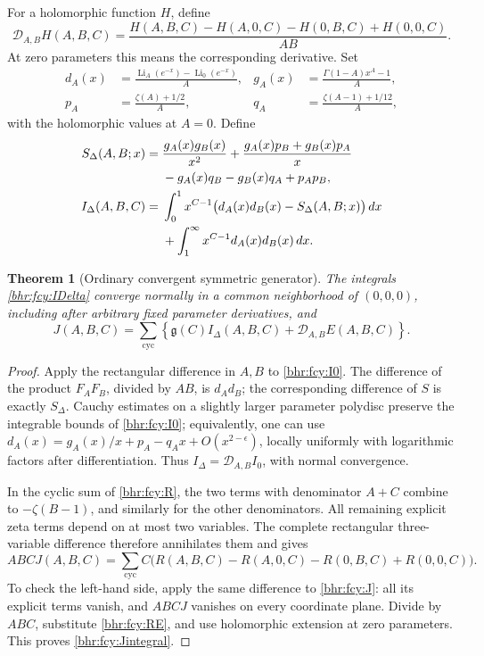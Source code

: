 \documentclass[11pt]{article}
\numberwithin{equation}{section}
\theoremstyle{plain}
\newtheorem{theorem}{Theorem}[section]
\theoremstyle{definition}
\theoremstyle{remark}
\begin{document}
For a holomorphic function \(H\), define
\[
 \mathcal D_{A,B}H(A,B,C)=
 \frac{H(A,B,C)-H(A,0,C)-H(0,B,C)+H(0,0,C)}{AB}.
\]
At zero parameters this means the corresponding derivative. Set
\begin{align*}
 d_A(x)&=\frac{\operatorname{Li}_A(e^{-x})-\operatorname{Li}_0(e^{-x})}{A},&
 g_A(x)&=\frac{\Gamma(1-A)x^A-1}{A},\\
 p_A&=\frac{\zeta(A)+1/2}{A},&
 q_A&=\frac{\zeta(A-1)+1/12}{A},
\end{align*}
with the holomorphic values at \(A=0\). Define
\begin{align}
 S_\Delta(A,B;x)={}&\frac{g_A(x)g_B(x)}{x^2}
 +\frac{g_A(x)p_B+g_B(x)p_A}{x}\notag\\
 &-g_A(x)q_B-g_B(x)q_A+p_Ap_B,
 \label{bhr:fcy:SDelta}\\
 I_\Delta(A,B,C)={}&\int_0^1x^{C-1}
 \bigl(d_A(x)d_B(x)-S_\Delta(A,B;x)\bigr)\,dx\notag\\
 &+\int_1^\infty x^{C-1}d_A(x)d_B(x)\,dx.
 \label{bhr:fcy:IDelta}
\end{align}

\begin{theorem}[Ordinary convergent symmetric generator]
\label{bhr:fcy:generator}
The integrals \eqref{bhr:fcy:IDelta} converge normally in a common
neighborhood of \((0,0,0)\), including after arbitrary fixed
parameter derivatives, and
\begin{equation}\label{bhr:fcy:Jintegral}
 J(A,B,C)=\sum_{\mathrm{cyc}}
 \left\{\mathfrak g(C)I_\Delta(A,B,C)+\mathcal D_{A,B}E(A,B,C)\right\}.
\end{equation}
\end{theorem}

\begin{proof}
Apply the rectangular difference in \(A,B\) to
\eqref{bhr:fcy:I0}. The difference of the product \(F_AF_B\),
divided by \(AB\), is \(d_Ad_B\); the corresponding difference
of \(S\) is exactly \(S_\Delta\). Cauchy estimates on a slightly
larger parameter polydisc preserve the integrable bounds of
\eqref{bhr:fcy:I0}; equivalently, one can use
\(d_A(x)=g_A(x)/x+p_A-q_Ax+O(x^{2-\epsilon})\), locally
uniformly with logarithmic factors after differentiation. Thus
\(I_\Delta=\mathcal D_{A,B}I_0\), with normal convergence.

In the cyclic sum of \eqref{bhr:fcy:R}, the two terms with
denominator \(A+C\) combine to \(-\zeta(B-1)\), and similarly
for the other denominators. All remaining explicit zeta terms
depend on at most two variables. The complete rectangular
three-variable difference therefore annihilates them and gives
\[
 ABCJ(A,B,C)=\sum_{\mathrm{cyc}}C\bigl(
 R(A,B,C)-R(A,0,C)-R(0,B,C)+R(0,0,C)\bigr).
\]
To check the left-hand side, apply the same difference to
\eqref{bhr:fcy:J}: all its explicit terms vanish, and \(ABCJ\)
vanishes on every coordinate plane. Divide by \(ABC\), substitute
\eqref{bhr:fcy:RE}, and use holomorphic extension at zero parameters.
This proves \eqref{bhr:fcy:Jintegral}.
\end{proof}
\end{document}
